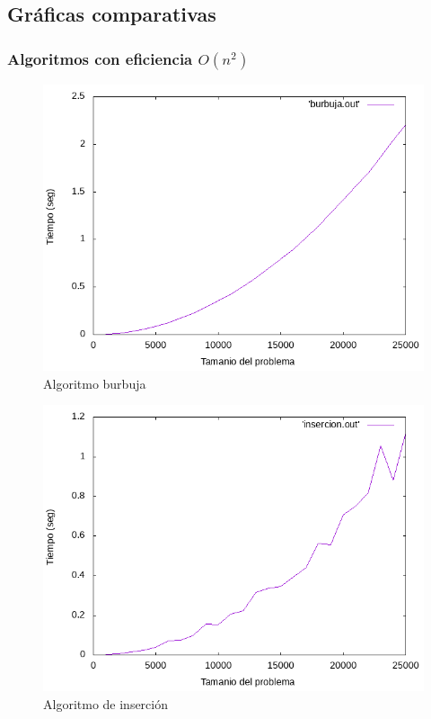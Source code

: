 \documentclass[12pt,spanish]{article}
\begin{document}
\newpage
\subsection{Gráficas comparativas}

\subsubsection{Algoritmos con eficiencia $O(n^2)$}
\begin{figure}[H]
\centering
\includegraphics[scale=0.75]{empirica_burbuja.png}
\caption{Algoritmo burbuja}
\end{figure}

\begin{figure}[H]
\centering
\includegraphics[scale=0.75]{empirica_insercion.png}
\caption{Algoritmo de inserción}
\end{figure}
\end{document}
